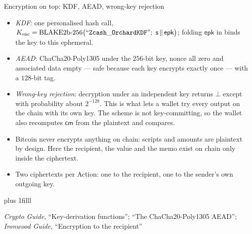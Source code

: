 \documentclass[aspectratio=169,11pt]{beamer}
\newcommand{\cmsym}{\ensuremath{\mathsf{cm}}}
\newcommand{\epk}{\ensuremath{\mathsf{epk}}}
\newcommand{\src}[1]{\par\vskip0pt plus 1filll
  {\fontsize{6}{7.2}\selectfont\color{arbdim}\raggedright #1\par}}
\begin{document}
\begin{frame}{Encryption on top: KDF, AEAD, wrong-key rejection}
\begin{itemize}
  \item \emph{KDF}: one personalised hash call,
    $K_{\mathrm{enc}} = \mathrm{BLAKE2b}\text{-}256\bigl(
      \Bpers{Zcash\_OrchardKDF};\ \mathsf{s} \,\|\, \epk\bigr)$; folding
    $\epk$ in binds the key to this ephemeral.
  \item \emph{AEAD}: ChaCha20-Poly1305 under the $256$-bit key, nonce all
    zero and associated data empty --- safe because each key encrypts
    exactly once --- with a $128$-bit tag.
  \item \emph{Wrong-key rejection}: decryption under an independent key
    returns $\bot$ except with probability about $2^{-128}$. This is what
    lets a wallet try every output on the chain with its own key. The
    scheme is not key-committing, so the wallet also recomputes $\cmsym$
    from the plaintext and compares.
  \item Bitcoin never encrypts anything on chain: scripts and amounts are
    plaintext by design. Here the recipient, the value and the memo exist
    on chain only inside the ciphertext.
  \item Two ciphertexts per Action: one to the recipient, one to the
    sender's own outgoing key.
\end{itemize}
\src{\emph{Crypto Guide}, ``Key-derivation functions''; ``The ChaCha20-Poly1305
  AEAD''; \emph{Ironwood Guide}, ``Encryption to the recipient''}
\end{frame}
\end{document}
